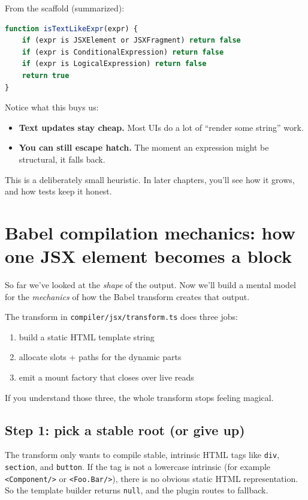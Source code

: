 From the scaffold (summarized):

\begin{lstlisting}[language=JavaScript]
function isTextLikeExpr(expr) {
	if (expr is JSXElement or JSXFragment) return false
	if (expr is ConditionalExpression) return false
	if (expr is LogicalExpression) return false
	return true
}
\end{lstlisting}

Notice what this buys us:

\begin{itemize}
\item \textbf{Text updates stay cheap.} Most UIs do a lot of ``render some string'' work.
\item \textbf{You can still escape hatch.} The moment an expression might be structural, it falls back.
\end{itemize}

This is a deliberately small heuristic.
In later chapters, you'll see how it grows, and how tests keep it honest.

\section{Babel compilation mechanics: how one JSX element becomes a block}

So far we've looked at the \emph{shape} of the output.
Now we'll build a mental model for the \emph{mechanics} of how the Babel transform creates that output.

The transform in \texttt{compiler/jsx/transform.ts} does three jobs:

\begin{enumerate}
\item build a static HTML template string
\item allocate slots + paths for the dynamic parts
\item emit a mount factory that closes over live reads
\end{enumerate}

If you understand those three, the whole transform stops feeling magical.

\subsection{Step 1: pick a stable root (or give up)}

The transform only wants to compile stable, intrinsic HTML tags like \texttt{div}, \texttt{section}, and \texttt{button}.
If the tag is not a lowercase intrinsic (for example \texttt{<Component/>} or \texttt{<Foo.Bar/>}), there is no obvious static HTML representation.
So the template builder returns \texttt{null}, and the plugin routes to fallback.

